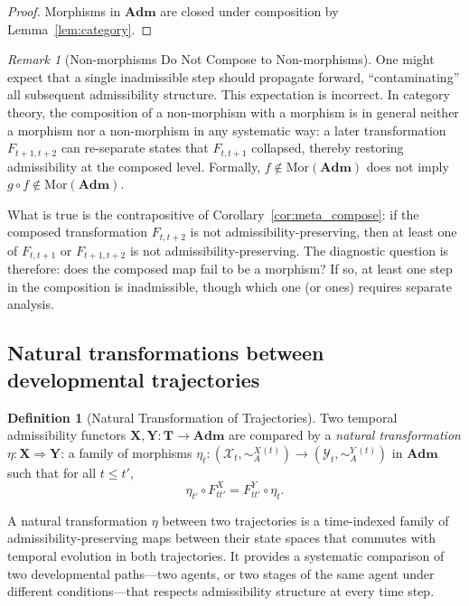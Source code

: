 \documentclass[11pt, a4paper]{article}
\theoremstyle{plain}
\theoremstyle{definition}
\newtheorem{definition}[theorem]{Definition}
\theoremstyle{remark}
\newtheorem{remark}[theorem]{Remark}
\newcommand{\calX}{\mathcal{X}}
\newcommand{\calY}{\mathcal{Y}}
\newcommand{\simA}{\sim_{\!A}}
\newcommand{\Adm}{\mathbf{Adm}}
\begin{document}
\begin{proof}
Morphisms in $\Adm$ are closed under composition by Lemma~\ref{lem:category}.
\end{proof}

\begin{remark}[Non-morphisms Do Not Compose to Non-morphisms]
One might expect that a single inadmissible step should propagate forward,
``contaminating'' all subsequent admissibility structure. This expectation is
incorrect. In category theory, the composition of a non-morphism with a
morphism is in general neither a morphism nor a non-morphism in any systematic
way: a later transformation $F_{t+1,t+2}$ can re-separate states that
$F_{t,t+1}$ collapsed, thereby restoring admissibility at the composed level.
Formally, $f \notin \mathrm{Mor}(\Adm)$ does not imply $g \circ f \notin
\mathrm{Mor}(\Adm)$.

What is true is the contrapositive of Corollary~\ref{cor:meta_compose}: if the
composed transformation $F_{t,t+2}$ is not admissibility-preserving, then at
least one of $F_{t,t+1}$ or $F_{t+1,t+2}$ is not admissibility-preserving.
The diagnostic question is therefore: does the composed map fail to be a
morphism? If so, at least one step in the composition is inadmissible, though
which one (or ones) requires separate analysis.
\end{remark}

\subsection{Natural transformations between developmental trajectories}

\begin{definition}[Natural Transformation of Trajectories]
Two temporal admissibility functors $\mathbf{X}, \mathbf{Y}\colon
\mathbf{T} \to \Adm$ are compared by a \emph{natural transformation}
$\eta\colon \mathbf{X} \Rightarrow \mathbf{Y}$: a family of morphisms
$\eta_t\colon (\calX_t, \simA^X{}^{(t)}) \to (\calY_t, \simA^Y{}^{(t)})$
in $\Adm$ such that for all $t \leq t'$,
\[
  \eta_{t'} \circ F_{tt'}^X = F_{tt'}^Y \circ \eta_t.
\]
\end{definition}

A natural transformation $\eta$ between two trajectories is a time-indexed
family of admissibility-preserving maps between their state spaces that
commutes with temporal evolution in both trajectories. It provides a systematic
comparison of two developmental paths---two agents, or two stages of the same
agent under different conditions---that respects admissibility structure at
every time step.
\end{document}
